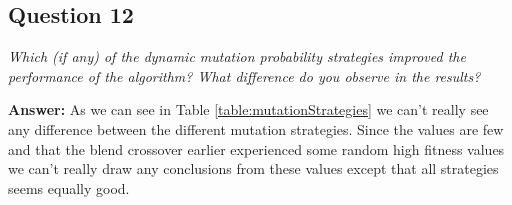 \documentclass[a4paper]{article}
\begin{document}
\begin{table}[h]
\caption{Comparing Mutation Strategies}
\label{table:mutationStrategies}
\end{table}
 
\subsection*{Question 12}
\emph{Which (if any) of the dynamic mutation probability strategies
improved the performance of the algorithm? What difference do you observe in the results?}

\textbf{Answer:} As we can see in Table \ref{table:mutationStrategies} we can't really see any difference between the different mutation strategies. Since the values are few and that the blend crossover earlier experienced some random high fitness values we can't really draw any conclusions from these values except that all strategies seems equally good. 
\end{document}
